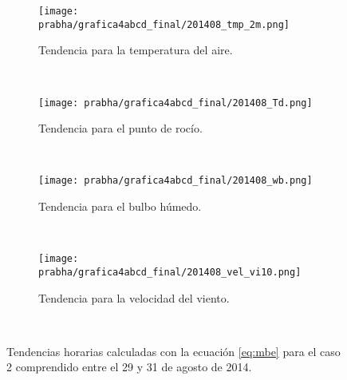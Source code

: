 \begin{figure}[H]
    \centering
    \begin{subfigure}[b]{0.45\textwidth}
        \caption{Tendencia para la temperatura del aire.}
	\texttt{[image: prabha/grafica4abcd\_final/201408\_tmp\_2m.png]}
    \label{subfig:tmp_0_caso2}
	\end{subfigure}
	~
	    \begin{subfigure}[b]{0.45\textwidth}
	        \caption{Tendencia para el punto de rocío.}
	\texttt{[image: prabha/grafica4abcd\_final/201408\_Td.png]}

    \label{subfig:td_caso2}
	\end{subfigure}
	~
	    \begin{subfigure}[b]{0.45\textwidth}
	\caption{Tendencia para el bulbo húmedo.}
	\texttt{[image: prabha/grafica4abcd\_final/201408\_wb.png]}
    \label{subfig:wb_caso2}
	\end{subfigure}
	~
	    \begin{subfigure}[b]{0.45\textwidth}
	\caption{Tendencia para la velocidad del viento.}	
	\texttt{[image: prabha/grafica4abcd\_final/201408\_vel\_vi10.png]}
    
    \label{subfig:vel_caso2}
	\end{subfigure}
	~

\caption{Tendencias horarias calculadas con la ecuación \ref{eq:mbe} para el caso 2 comprendido entre el 29 y 31 de agosto de 2014.}	
\label{subfig:mbe_caso2}	
\end{figure}


